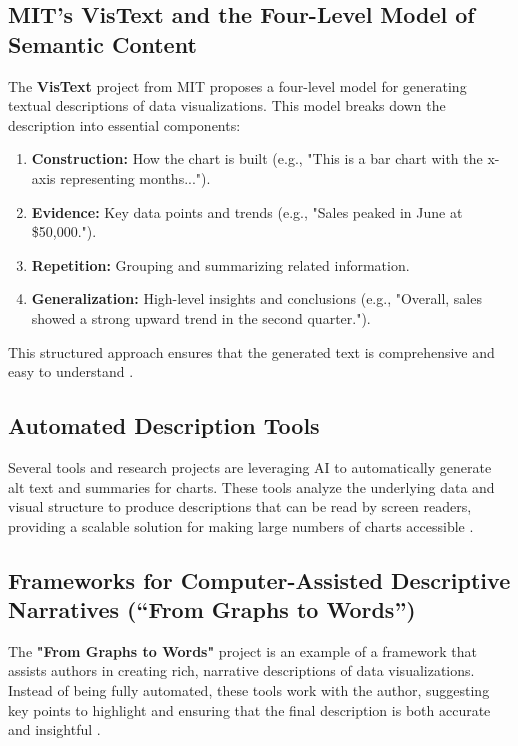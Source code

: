 \subsection{MIT's VisText and the Four-Level Model of Semantic Content}\label{ch13:ssec:vistext}
The \textbf{VisText} project from MIT proposes a four-level model for generating textual descriptions of data visualizations. This model breaks down the description into essential components:
\begin{enumerate}
	\item \textbf{Construction:} How the chart is built (e.g., "This is a bar chart with the x-axis representing months...").
	\item \textbf{Evidence:} Key data points and trends (e.g., "Sales peaked in June at \$50,000.").
	\item \textbf{Repetition:} Grouping and summarizing related information.
	\item \textbf{Generalization:} High-level insights and conclusions (e.g., "Overall, sales showed a strong upward trend in the second quarter.").
\end{enumerate}
This structured approach ensures that the generated text is comprehensive and easy to understand \supercite{VisText, Lundgard2022Accessible}.

\subsection{Automated Description Tools}\label{ch13:ssec:automated-description}
Several tools and research projects are leveraging \gls{AI} to automatically generate alt text and summaries for charts. These tools analyze the underlying data and visual structure to produce descriptions that can be read by screen readers, providing a scalable solution for making large numbers of charts accessible \supercite{Smits2024AltGosling, SeeChart}.

\subsection{Frameworks for Computer-Assisted Descriptive Narratives (``From Graphs to Words'')}\label{ch13:ssec:descriptive-narratives}
The \textbf{"From Graphs to Words"} project is an example of a framework that assists authors in creating rich, narrative descriptions of data visualizations. Instead of being fully automated, these tools work with the author, suggesting key points to highlight and ensuring that the final description is both accurate and insightful \supercite{FromGraphsToWords}.

